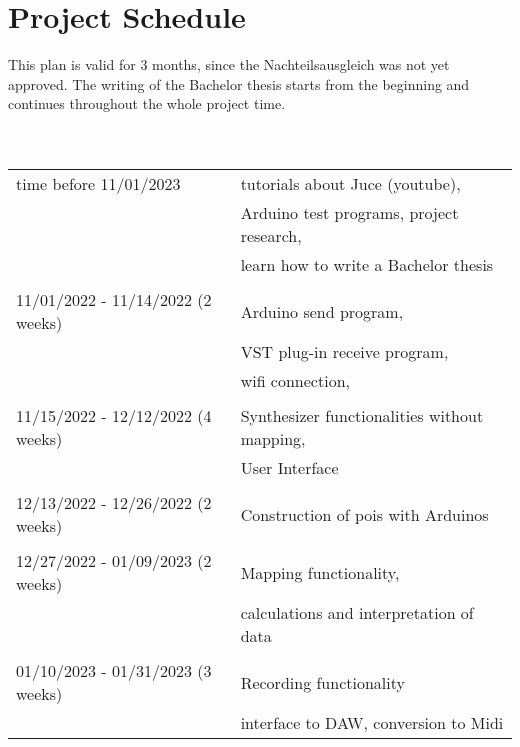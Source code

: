 \newpage
\section{Project Schedule}
This plan is valid for 3 months, since the Nachteilsausgleich was not yet approved. The writing of the Bachelor thesis starts from the beginning and continues throughout the whole project time.
\\ \\ \\
\begin{tabular}{l l}
	time before 11/01/2023				& 	tutorials about Juce (youtube), \\
										&	Arduino test programs, project research, \\
										&	learn how to write a Bachelor thesis \\ \\
	11/01/2022 - 11/14/2022	(2 weeks)	& 	Arduino send program, \\ 
										&	VST plug-in receive program, \\
										&	wifi connection, \\ \\
	11/15/2022 - 12/12/2022 (4 weeks)	&   Synthesizer functionalities without mapping, \\ 
										&	User Interface \\ \\
	12/13/2022 - 12/26/2022 (2 weeks) 	&	Construction of pois with Arduinos \\ \\
	12/27/2022 - 01/09/2023 (2 weeks)	& 	Mapping functionality, \\
										&	calculations and interpretation of data \\ \\
	01/10/2023 - 01/31/2023 (3 weeks)	&	Recording functionality \\
										&	interface to DAW, conversion to Midi
\end{tabular}
